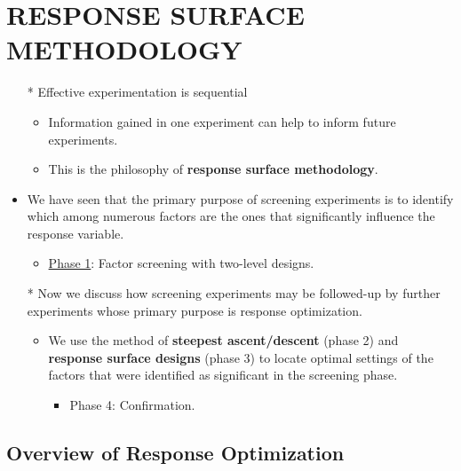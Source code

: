 \chapter{RESPONSE SURFACE METHODOLOGY}
\begin{itemize}
    \item[*] Effective experimentation is sequential
        \begin{itemize}
            \item Information gained in one experiment can help to inform future experiments.
            \item This is the philosophy of \textbf{response surface methodology}.
        \end{itemize}
    \item We have seen that the primary purpose of screening experiments is to identify which among numerous
          factors are the ones that significantly influence the response variable.
          \begin{itemize}[$\hookrightarrow$]
              \item \underline{Phase 1}: Factor screening with two-level designs.
          \end{itemize}
    \item[*] Now we discuss how screening experiments may be followed-up by further experiments whose primary
        purpose is response optimization.
        \begin{itemize}[$\hookrightarrow$]
            \item We use the method of \textbf{steepest ascent/descent} (phase 2) and \textbf{response surface designs} (phase 3) to locate
                  optimal settings of the factors that were identified as significant in the screening phase.
                  \begin{itemize}
                      \item Phase 4: Confirmation.
                  \end{itemize}
        \end{itemize}
\end{itemize}
\section{Overview of Response Optimization}
